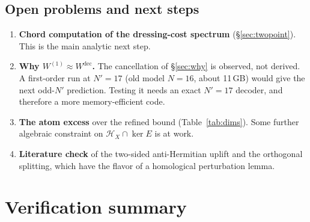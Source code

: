 \documentclass[11pt]{article}
\newcommand{\Np}{N'}
\newcommand{\Hc}{\mathcal H}
\newcommand{\dec}{\mathrm{dec}}
\newcommand{\Wone}{W^{(1)}}
\theoremstyle{plain}
\theoremstyle{remark}
\numberwithin{equation}{section}
\begin{document}
\subsection{Open problems and next steps}

\begin{enumerate}\itemsep2pt
\item \textbf{Chord computation of the dressing-cost spectrum} (\S\ref{sec:twopoint}). This is the main analytic next step.
\item \textbf{Why $\Wone\approx W^\dec$.} The cancellation of \S\ref{sec:why} is observed, not derived. A first-order run
  at $\Np=17$ (old model $N=16$, about 11\,GB) would give the next odd-$\Np$ prediction. Testing it needs an exact
  $\Np=17$ decoder, and therefore a more memory-efficient code.
\item \textbf{The atom excess} over the refined bound (Table~\ref{tab:dims}). Some further algebraic constraint on
  $\Hc_X\cap\ker E$ is at work.
\item \textbf{Literature check} of the two-sided anti-Hermitian uplift and the orthogonal splitting, which have the flavor
  of a homological perturbation lemma.
\end{enumerate}

\appendix

\section{Verification summary}\label{app:verify}
\end{document}

